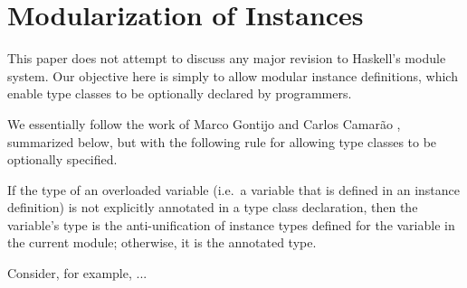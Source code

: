 \section{Modularization of Instances}
\label{sec:modular-instances}

This paper does not attempt to discuss any major revision to Haskell's
module system. Our objective here is simply to allow modular instance
definitions, which enable type classes to be optionally declared by
programmers.

We essentially follow the work of Marco Gontijo and Carlos Camarão
\cite{...}, summarized below, but with the following rule for allowing
type classes to be optionally specified.

\begin{definition}

If the type of an overloaded variable (i.e.~a variable that is defined
in an instance definition) is not explicitly annotated in a type class
declaration, then the variable's type is the anti-unification of
instance types defined for the variable in the current module;
otherwise, it is the annotated type.

\label{overloaded-variable-type}
\end{definition}

Consider, for example, ...



